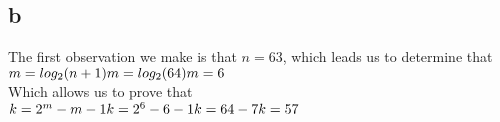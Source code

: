 \subsection{b}
The first observation we make is that $n = 63$, which leads us to determine that \\ $m = log_{2}(n+1) \\ m = log_{2}(64) \\ m = 6$ \\
Which allows us to prove that \\ $k = 2^{m} - m - 1 \\ k = 2^{6} - 6 - 1 \\ k = 64 - 7 \\ k = 57$ \\
